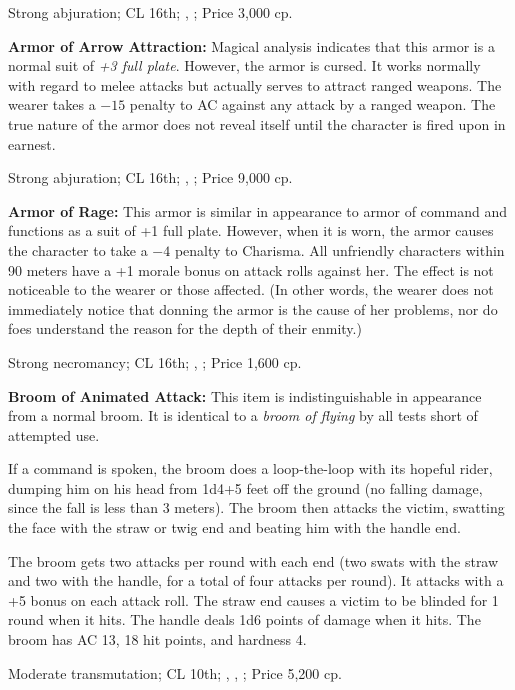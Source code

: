 Strong abjuration; CL 16th; , ; Price 3,000 cp.

\textbf{Armor of Arrow Attraction:} Magical analysis indicates that this armor is a normal suit of \emph{+3 full plate}. However, the armor is cursed. It works normally with regard to melee attacks but actually serves to attract ranged weapons. The wearer takes a $-15$ penalty to AC against any attack by a ranged weapon. The true nature of the armor does not reveal itself until the character is fired upon in earnest.

Strong abjuration; CL 16th; , ; Price 9,000 cp.

\textbf{Armor of Rage:} This armor is similar in appearance to armor of command and functions as a suit of +1 full plate. However, when it is worn, the armor causes the character to take a $-4$ penalty to Charisma. All unfriendly characters within 90 meters have a +1 morale bonus on attack rolls against her. The effect is not noticeable to the wearer or those affected. (In other words, the wearer does not immediately notice that donning the armor is the cause of her problems, nor do foes understand the reason for the depth of their enmity.)

Strong necromancy; CL 16th; , ; Price 1,600 cp.

\textbf{Broom of Animated Attack:} This item is indistinguishable in appearance from a normal broom. It is identical to a \emph{broom of flying} by all tests short of attempted use.

If a command is spoken, the broom does a loop-the-loop with its hopeful rider, dumping him on his head from 1d4+5 feet off the ground (no falling damage, since the fall is less than 3 meters). The broom then attacks the victim, swatting the face with the straw or twig end and beating him with the handle end.

The broom gets two attacks per round with each end (two swats with the straw and two with the handle, for a total of four attacks per round). It attacks with a +5 bonus on each attack roll. The straw end causes a victim to be blinded for 1 round when it hits. The handle deals 1d6 points of damage when it hits. The broom has AC 13, 18 hit points, and hardness 4.

Moderate transmutation; CL 10th; , , ; Price 5,200 cp.

